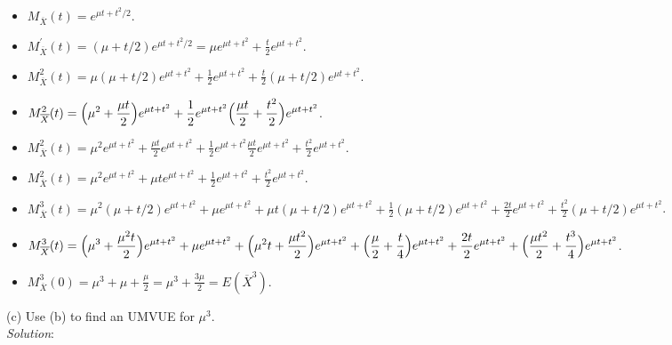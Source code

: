 \documentclass[12pt]{article}
\newcommand{\ds}{\displaystyle}
\begin{document}
\begin{itemize}
    \item $ \ds M_{\overline{X}}(t) = e^{\mu t + t^{2} / 2 } $.
    \item $ \ds M_{\overline{X}}^{'}(t) = (\mu + t/2)e^{\mu t + t^{2} / 2 } = \mu e^{\mu t + t^{2}} + \frac{t}{2} e^{\mu t + t^{2}} $.
    \item $ \ds M_{\overline{X}}^{2}(t) = \mu (\mu + t/2) e^{\mu t + t^{2}} + \frac{1}{2} e^{\mu t + t^{2}} + \frac{t}{2} (\mu + t/2) e^{\mu t + t^{2}} $.
    \item $ \ds M_{\overline{X}}^{2}(t) = \Bigl( \mu^{2} + \frac{\mu t}{2} \Bigr) e^{\mu t + t^{2}} + \frac{1}{2} e^{\mu t + t^{2}}  \Bigl( \frac{\mu t}{2} + \frac{t^{2}}{2} \Bigr) e^{\mu t + t^{2}} $.
    \item $ \ds M_{\overline{X}}^{2}(t) = \mu^{2} e^{\mu t + t^{2}} + \frac{\mu t}{2} e^{\mu t + t^{2}} + \frac{1}{2} e^{\mu t + t^{2}}  \frac{\mu t}{2} e^{\mu t + t^{2}} + \frac{t^{2}}{2} e^{\mu t + t^{2}} $.
    \item $ \ds M_{\overline{X}}^{2}(t) = \mu^{2} e^{\mu t + t^{2}} + \mu t e^{\mu t + t^{2}} + \frac{1}{2} e^{\mu t + t^{2}} + \frac{t^{2}}{2} e^{\mu t + t^{2}} $.
    \item $ \ds M_{\overline{X}}^{3}(t) = \mu^{2} (\mu + t/2) e^{\mu t + t^{2}} + \mu e^{\mu t + t^{2}} + \mu t (\mu + t/2) e^{\mu t + t^{2}} + \frac{1}{2} (\mu + t/2) e^{\mu t + t^{2}} + \frac{2t}{2} e^{\mu t + t^{2}} + \frac{t^{2}}{2} (\mu + t/2) e^{\mu t + t^{2}} $.
    \item $ \ds M_{\overline{X}}^{3}(t) =  \Bigl( \mu^{3} + \frac{\mu^{2} t}{2} \Bigr) e^{\mu t + t^{2}} + \mu e^{\mu t + t^{2}} + \Bigl( \mu^{2}t + \frac{\mu t^{2}}{2} \Bigr) e^{\mu t + t^{2}} + \Bigl( \frac{\mu}{2} + \frac{t}{4} \Bigr) e^{\mu t + t^{2}} + \frac{2t}{2} e^{\mu t + t^{2}} + \Bigl( \frac{\mu t^{2}}{2} + \frac{t^{3}}{4} \Bigr) e^{\mu t + t^{2}} $.
    \item $ \ds M_{\overline{X}}^{3}(0) =  \mu^{3} + \mu + \frac{\mu}{2} = \mu^{3} + \frac{3\mu}{2} = E(\overline{X}^{3}) $.
\end{itemize}

\vspace{2.5mm}

(c) Use (b) to find an UMVUE for $ \mu^{3} $. 
\vspace{2.5mm} \\
\textit{Solution}:
\vspace{2.5mm} \\
\end{document}
